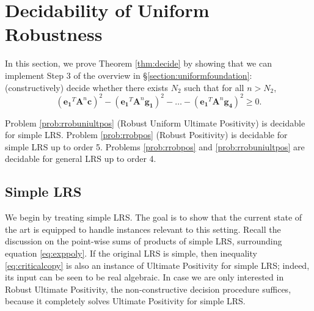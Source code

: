 \section{Decidability of Uniform Robustness}
\label{section:decidability}

  \label{thm:abelian}

In this section, we prove Theorem \ref{thm:decide} by showing that we can implement Step 3 of the overview in \S\ref{section:uniformfoundation}: (constructively) decide whether there exists $N_2$ such that for all $n > N_2$,
\begin{equation}
\label{eq:criticalcopy}
(\mathbf{e_1}^T \mathbf{A}^n \mathbf{c})^2 - (\mathbf{e_1}^T \mathbf{A}^n \mathbf{g_1})^2 - \dots - (\mathbf{e_1}^T \mathbf{A}^n \mathbf{g_4})^2 \ge 0.
\end{equation}

\begin{theorem}
\label{thm:decidecopy}
Problem \ref{prob:rrobuniultpos} (Robust Uniform Ultimate Positivity) is decidable for simple LRS. Problem \ref{prob:rrobpos} (Robust Positivity) is decidable for simple LRS up to order 5. Problems \ref{prob:rrobpos} and \ref{prob:rrobuniultpos} are decidable for general LRS up to order 4.
\end{theorem}

\subsection{Simple LRS}
We begin by treating simple LRS. The goal is to show that the current state of the art is equipped to handle instances relevant to this setting. Recall the discussion on the point-wise sums of products of simple LRS, surrounding equation \ref{eq:exppoly}. If the original LRS is simple, then inequality \ref{eq:criticalcopy} is also an instance of Ultimate Positivity for simple LRS; indeed, its input can be seen to be real algebraic. In case we are only interested in Robust Ultimate Positivity, the non-constructive decision procedure \cite{ouaknine2014ultimate} suffices, because it completely solves Ultimate Positivity for simple LRS. 

